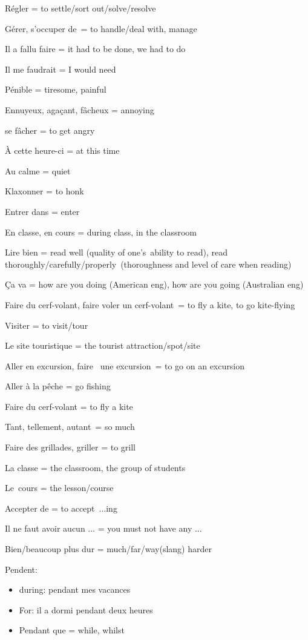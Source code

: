 {Régler = to settle/sort out/solve/resolve}

{Gérer, s'occuper de~= to handle/deal with, manage}

Il a fallu faire = it had to be done, we had to do

Il me faudrait = I would need~

{Pénible = tiresome, painful~}

{Ennuyeux, agaçant, fâcheux = annoying~}

{se fâcher = to get angry}

{À cette heure-ci = at this time~}

{Au calme = quiet~}

{Klaxonner = to honk}

{Entrer dans = enter}

{En classe, en cours = during class, in the classroom~}

{Lire bien = read well (quality of one's~ability to read), read
thoroughly/carefully/properly~(thoroughness and level of care when
reading)}

{Ça va = how are you doing (American eng), how are you going (Australian
eng)}

{Faire du cerf-volant, faire voler un cerf-volant~= to fly a kite, to go
kite-flying}

{Visiter = to visit/tour}

{Le site touristique = the tourist attraction/spot/site}

{Aller en excursion, faire~ une excursion~= to go on an excursion~}

{Aller à la pêche = go fishing~}

{Faire du cerf-volant = to fly a kite}

{Tant, tellement, autant~= so much~}

{Faire des grillades, griller = to grill}

{La classe = the classroom, the group of students~}

Le~{cours = the lesson/course~}

{Accepter de = to accept~...ing}

{Il ne faut avoir aucun ... = you must not have any ...}

{Bien/beaucoup plus dur = much/far/way(slang) harder}

{Pendent:}

\begin{itemize}
\item
  {during: pendant mes vacances~}
\item
  {For: il a dormi pendant deux heures~}
\item
  {Pendant que = while, whilst}
\end{itemize}

